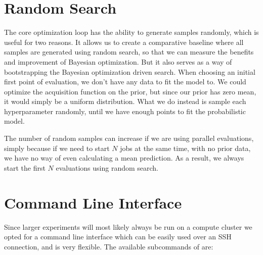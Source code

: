 \section{Random Search}

The core optimization loop has the ability to generate samples randomly, which is useful for two reasons. It allows us to create a comparative baseline where all samples are generated using random search, so that we can measure the benefits and improvement of Bayesian optimization. But it also serves as a way of bootstrapping the Bayesian optimization driven search. When choosing an initial first point of evaluation, we don't have any data to fit the model to. We could optimize the acquisition function on the prior, but since our prior has zero mean, it would simply be a uniform distribution. What we do instead is sample each hyperparameter randomly, until we have enough points to fit the probabilistic model.

The number of random samples can increase if we are using parallel evaluations, simply because if we need to start $N$ jobs at the same time, with no prior data, we have no way of even calculating a mean prediction. As a result, we always start the first $N$ evaluations using random search.

\section{Command Line Interface}
\label{section:command-line-interface}

Since larger experiments will most likely always be run on a compute cluster we opted for a command line interface which can be easily used over an SSH connection, and is very flexible. The available subcommands of \bopt are:

